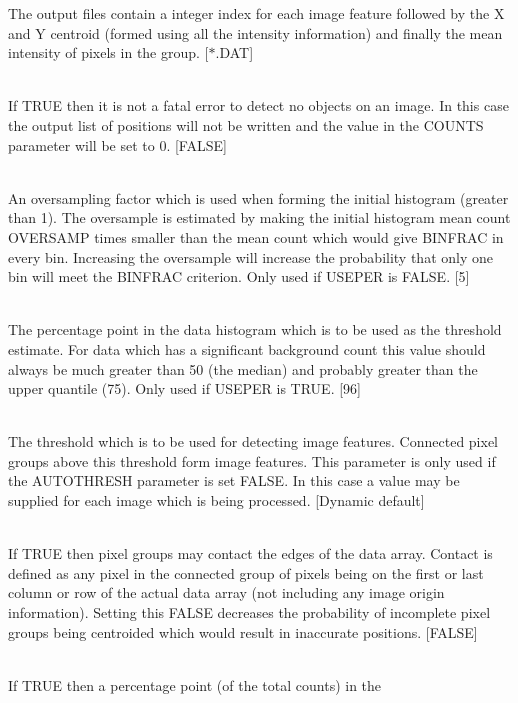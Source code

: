 \documentclass[twoside,11pt]{article}
\renewcommand{\_}{\texttt{\symbol{95}}}
\newcommand{\sstsubsection}[1]{ \item[{#1}] \mbox{} \\}
\newcommand{\sstsubsection}[1]{\item[{#1}]}
\begin{document}
{{{         The output files contain a integer index for each image
         feature followed by the X and Y centroid (formed using all the
         intensity information) and finally the mean intensity of
         pixels in the group.
         [$*$.DAT]
      }
      \sstsubsection{
         OVERRIDE = \_LOGICAL (Read)
      } {
         If TRUE then it is not a fatal error to detect no objects on an 
         image. In this case the output list of positions will not be
         written and the value in the COUNTS parameter will be set to 0.
         [FALSE]
      }
      \sstsubsection{
         OVERSAMP = \_INTEGER (Read)
      } {
         An oversampling factor which is used when forming the initial
         histogram (greater than 1). The oversample is estimated by
         making the initial histogram mean count OVERSAMP times
         smaller than the mean count which would give BINFRAC in every
         bin. Increasing the oversample will increase the probability
         that only one bin will meet the BINFRAC criterion.  Only used
         if USEPER is FALSE.
         [5]
      }
      \sstsubsection{
         PERCENTILE = \_DOUBLE (Read)
      } {
         The percentage point in the data histogram which is to be used
         as the threshold estimate.  For data which has a significant
         background count this value should always be much greater than
         50 (the median) and probably greater than the upper quantile
         (75). Only used if USEPER is TRUE.
         [96]
      }
      \sstsubsection{
         THRESH = \_DOUBLE (Read)
      } {
         The threshold which is to be used for detecting image
         features.  Connected pixel groups above this threshold form
         image features. This parameter is only used if the AUTOTHRESH
         parameter is set FALSE. In this case a value may be supplied
         for each image which is being processed.
         [Dynamic default]
      }
      \sstsubsection{
         TOUCH = \_LOGICAL (Read)
      } {
         If TRUE then pixel groups may contact the edges of the data
         array. Contact is defined as any pixel in the connected group
         of pixels being on the first or last column or row of the
         actual data array (not including any image origin information).
         Setting this FALSE decreases the probability of incomplete
         pixel groups being centroided which would result in inaccurate
         positions.
         [FALSE]
      }
      \sstsubsection{
         USEPER = \_LOGICAL (Read)
      } {
         If TRUE then a percentage point (of the total counts) in the
}}}
\end{document}
